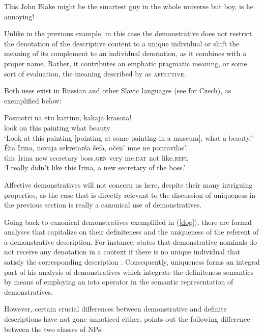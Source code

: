 \documentclass[output=paper,colorlinks,citecolor=brown]{langscibook}
\begin{document}
\ea 
This John Blake might be the smartest guy in the whole universe but boy, is he annoying!
\z

\noindent Unlike in the previous example, in this case the demonstrative does not restrict the denotation of the descriptive content to a unique individual or shift the meaning of its complement to an individual denotation, as it combines with a proper name. Rather, it contributes an emphatic pragmatic meaning, or some sort of evaluation, the meaning described by \citet{lakoff74} as \textsc{affective}. 

Both uses exist in Russian and other Slavic languages (see \citealt{simik16} for Czech), as exemplified below: 

\ea
\ea \gll	Posmotri 	na 	\.{e}tu kartinu, 	kakaja 	krasota! \\
look 	on	this painting 	what 	beauty \\
\glt `Look at this painting [pointing at some painting in a museum], what a beauty!'
\ex \gll \.{E}ta Irina, 	novaja sekretar\v{s}a \v{s}efa, 		o\v{c}en'  mne 	 ne ponravilas'. \\
this Irina 		new 	secretary 	boss.\textsc{gen} very 	me.\textsc{dat} not like.\textsc{refl} \\
\glt `I really didn't like this Irina, a new secretary of the boss.'
\z
\z

\noindent Affective demonstratives will not concern us here, despite their many intriguing properties, as the case that is directly relevant to the discussion of uniqueness in the previous section is really a canonical use of demonstratives. 

Going back to canonical demonstratives exemplified in (\ref{dog}), there are formal analyses that capitalize on their definiteness and the uniqueness of the referent of a demonstrative description. For instance, \citet{elbourne08} states that demonstrative nominals do not receive any denotation in a context if there is no unique individual that satisfy the corresponding description \citep[][26]{elbourne08}. Consequently, uniqueness forms an integral part of his analysis of demonstratives which integrate the definiteness semantics by means of employing an iota operator in the semantic representation of demonstratives. 

However, certain crucial differences between demonstrative and definite descriptions have not gone unnoticed either. \citet{roberts02} points out the following difference between the two classes of NPs: 

\ea
{}
\z\z
\end{document}
